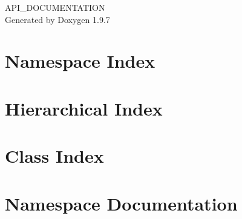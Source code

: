 \documentclass[twoside]{book}
\newcommand{\+}{\discretionary{\mbox{\scriptsize$\hookleftarrow$}}{}{}}
\newcommand{\clearemptydoublepage}{%
    \newpage{\pagestyle{empty}\cleardoublepage}%
  }
\begin{document}
  \raggedbottom
    \hypersetup{pageanchor=false,
                bookmarksnumbered=true,
                pdfencoding=unicode
               }
  \begin{titlepage}
  \vspace*{7cm}
  \begin{center}%
  {\Large API\+\_\+\+DOCUMENTATION}\\
  \vspace*{1cm}
  {\large Generated by Doxygen 1.9.7}\\
  \end{center}
  \end{titlepage}
  \clearemptydoublepage
  \tableofcontents
  \clearemptydoublepage
  \hypersetup{pageanchor=true}
\chapter{Namespace Index}

\chapter{Hierarchical Index}

\chapter{Class Index}

\chapter{Namespace Documentation}












\end{document}
